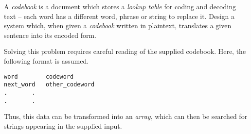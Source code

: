 
\vspace*{-1cm}

\problem A \textit{codebook} is a document which stores a \textit{lookup table} for coding and decoding text --
each word has a different word, phrase or string to replace it.
Design a system which, when given a \textit{codebook} written in plaintext, translates a given sentence into its encoded form.

\solution
Solving this problem requires careful reading of the supplied codebook. Here, the following format is assumed.
\begin{lstlisting}[numbers=none, xleftmargin=.3\textwidth, xrightmargin=.2\textwidth]
word		codeword
next_word	other_codeword
.		.
.		.
\end{lstlisting}
Thus, this data can be transformed into an \textit{array}, which can then be searched for strings appearing in
the supplied input.

